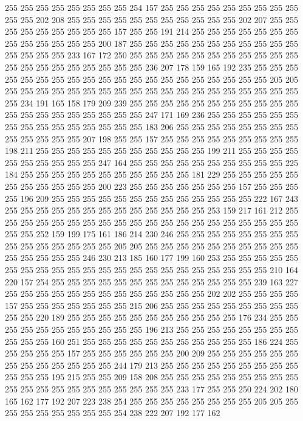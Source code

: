 255 255 255 255 255 255 255 255 254 157 255 255 255 255 255 255 255 255 255 255
255 202 208 255 255 255 255 255 255 255 255 255 255 255 202 207 255 255 255 255
255 255 255 255 255 157 255 255 191 214 255 255 255 255 255 255 255 255 255 255
255 255 255 200 187 255 255 255 255 255 255 255 255 255 255 255 255 255 255 255
233 167 172 250 255 255 255 255 255 255 255 255 255 255 255 255 255 255 255 255
255 255 255 255 236 207 178 159 165 192 235 255 255 255 255 255 255 255 255 255
255 255 255 255 255 255 255 255 255 255 255 205 205 255 255 255 255 255 255 255
255 255 255 255 255 255 255 255 255 255 255 255 255 234 191 165 158 179 209 239
255 255 255 255 255 255 255 255 255 255 255 255 255 255 255 255 255 255 255 255
247 171 169 236 255 255 255 255 255 255 255 255 255 255 255 255 255 255 255 183
206 255 255 255 255 255 255 255 255 255 255 255 255 255 207 198 255 255 157 255
255 255 255 255 255 255 255 255 198 211 255 255 255 255 255 255 255 255 255 255
255 199 211 255 255 255 255 255 255 255 255 255 255 247 164 255 255 255 255 255
255 255 255 255 255 225 184 255 255 255 255 255 255 255 255 255 255 255 181 229
255 255 255 255 255 255 255 255 255 255 255 200 223 255 255 255 255 255 255 255
157 255 255 255 255 196 209 255 255 255 255 255 255 255 255 255 255 255 255 255
222 167 243 255 255 255 255 255 255 255 255 255 255 255 255 255 253 159 217 161
212 255 255 255 255 255 255 255 255 255 255 255 255 255 255 255 255 255 255 255
255 255 255 252 159 199 175 161 186 214 230 246 255 255 255 255 255 255 255 255
255 255 255 255 255 255 255 205 205 255 255 255 255 255 255 255 255 255 255 255
255 255 255 255 246 230 213 185 160 177 199 160 253 255 255 255 255 255 255 255
255 255 255 255 255 255 255 255 255 255 255 255 255 255 255 210 164 220 157 254
255 255 255 255 255 255 255 255 255 255 255 255 255 239 163 227 255 255 255 255
255 255 255 255 255 255 255 255 255 202 202 255 255 255 255 157 255 255 255 255
255 255 255 215 206 255 255 255 255 255 255 255 255 255 255 255 220 189 255 255
255 255 255 255 255 255 255 255 255 176 234 255 255 255 255 255 255 255 255 255
255 255 196 213 255 255 255 255 255 255 255 255 255 255 255 160 251 255 255 255
255 255 255 255 255 255 255 255 186 224 255 255 255 255 255 157 255 255 255 255
255 255 200 209 255 255 255 255 255 255 255 255 255 255 255 255 255 244 179 213
255 255 255 255 255 255 255 255 255 255 255 255 195 215 255 255 209 158 208 255
255 255 255 255 255 255 255 255 255 255 255 255 255 255 255 255 255 255 255 233
177 255 255 250 224 202 180 165 162 177 192 207 223 238 254 255 255 255 255 255
255 255 255 205 205 255 255 255 255 255 255 255 255 254 238 222 207 192 177 162
